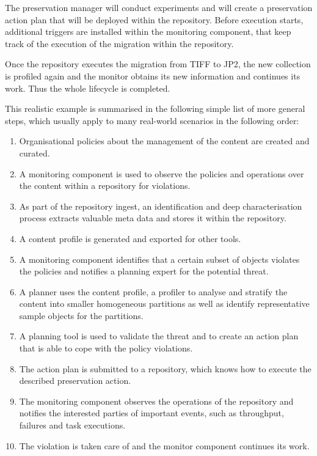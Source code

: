 The preservation manager will conduct experiments and will create a preservation action plan that will be deployed within the repository. Before execution starts, additional triggers are installed within the monitoring component, that keep track of the execution of the migration within the repository.

Once the repository executes the migration from TIFF to JP2, the new collection is profiled again and the monitor obtains its new information and continues its work. Thus the whole lifecycle is completed.

This realistic example is summarised in the following simple list of more general steps, which usually apply to many real-world scenarios in the following order:

\begin{enumerate}
\item Organisational policies about the management of the content are created and curated.
\item A monitoring component is used to observe the policies and operations over the content within a repository for violations.
\item As part of the repository ingest, an identification and deep characterisation process extracts valuable meta data and stores it within the repository.
\item A content profile is generated and exported for other tools.
\item A monitoring component identifies that a certain subset of objects violates the policies and notifies a planning expert for the potential threat.
\item A planner uses the content profile, a profiler to analyse and stratify the content into smaller homogeneous partitions as well as identify representative sample objects for the partitions.
\item A planning tool is used to validate the threat and to create an action plan that is able to cope with the policy violations.
\item The action plan is submitted to a repository, which knows how to execute the described preservation action.
\item The monitoring component observes the operations of the repository and notifies the interested parties of important events, such as throughput, failures and task executions. 
\item The violation is taken care of and the monitor component continues its work.
\end{enumerate}

